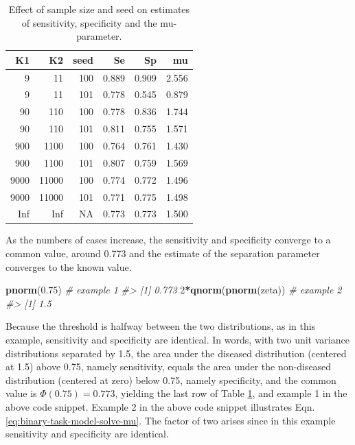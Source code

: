 \documentclass[
]{book}
\newenvironment{Shaded}{\begin{snugshade}}{\end{snugshade}}
\newcommand{\CommentTok}[1]{\textcolor[rgb]{0.56,0.35,0.01}{\textit{#1}}}
\newcommand{\DecValTok}[1]{\textcolor[rgb]{0.00,0.00,0.81}{#1}}
\newcommand{\FloatTok}[1]{\textcolor[rgb]{0.00,0.00,0.81}{#1}}
\newcommand{\KeywordTok}[1]{\textcolor[rgb]{0.13,0.29,0.53}{\textbf{#1}}}
\newcommand{\NormalTok}[1]{#1}
\newcommand{\OperatorTok}[1]{\textcolor[rgb]{0.81,0.36,0.00}{\textbf{#1}}}
\begin{document}
\begin{table}

\caption{\label{tab:binary-task-modelSeSpMuvsCaseSizeSeed}Effect of sample size and seed on estimates of sensitivity, specificity and the mu-parameter.}
\centering
\begin{tabular}[t]{r|r|r|r|r|r}
\hline
K1 & K2 & seed & Se & Sp & mu\\
\hline
9 & 11 & 100 & 0.889 & 0.909 & 2.556\\
\hline
9 & 11 & 101 & 0.778 & 0.545 & 0.879\\
\hline
90 & 110 & 100 & 0.778 & 0.836 & 1.744\\
\hline
90 & 110 & 101 & 0.811 & 0.755 & 1.571\\
\hline
900 & 1100 & 100 & 0.764 & 0.761 & 1.430\\
\hline
900 & 1100 & 101 & 0.807 & 0.759 & 1.569\\
\hline
9000 & 11000 & 100 & 0.774 & 0.772 & 1.496\\
\hline
9000 & 11000 & 101 & 0.771 & 0.775 & 1.498\\
\hline
Inf & Inf & NA & 0.773 & 0.773 & 1.500\\
\hline
\end{tabular}
\end{table}

As the numbers of cases increase, the sensitivity and specificity converge to a common value, around 0.773 and the estimate of the separation parameter converges to the known value.

\begin{Shaded}
\begin{Highlighting}[]
\KeywordTok{pnorm}\NormalTok{(}\FloatTok{0.75}\NormalTok{) }\CommentTok{# example 1}
\CommentTok{#> [1] 0.773}
\DecValTok{2}\OperatorTok{*}\KeywordTok{qnorm}\NormalTok{(}\KeywordTok{pnorm}\NormalTok{(zeta)) }\CommentTok{# example 2}
\CommentTok{#> [1] 1.5}
\end{Highlighting}
\end{Shaded}

Because the threshold is halfway between the two distributions, as in this example, sensitivity and specificity are identical. In words, with two unit variance distributions separated by 1.5, the area under the diseased distribution (centered at 1.5) above 0.75, namely sensitivity, equals the area under the non-diseased distribution (centered at zero) below 0.75, namely specificity, and the common value is \(\Phi(0.75)= 0.773\), yielding the last row of Table \ref{tab:binary-task-modelSeSpMuvsCaseSizeSeed}, and example 1 in the above code snippet. Example 2 in the above code snippet illustrates Eqn. \eqref{eq:binary-task-model-solve-mu}. The factor of two arises since in this example sensitivity and specificity are identical.
\end{document}
